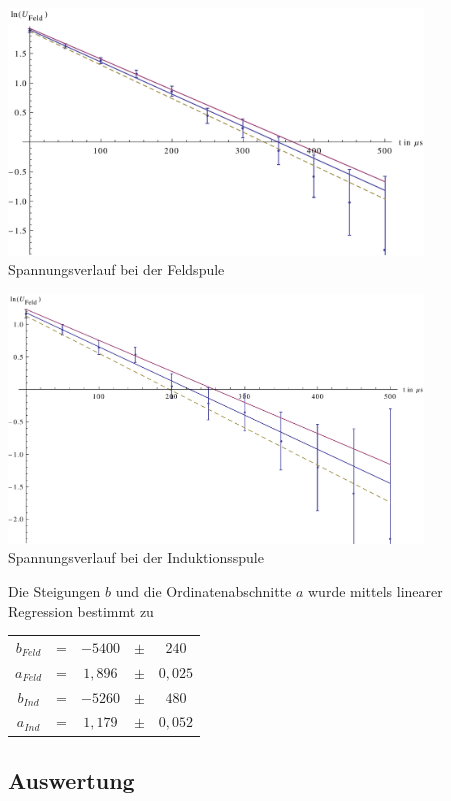 \documentclass{article}
\begin{document}
\newpage
\begin{center}

  \includegraphics[width=11cm]{graph1}
	Spannungsverlauf bei der Feldspule

	\centering
  \includegraphics[width=11cm]{graph2}
	Spannungsverlauf bei der Induktionsspule
\end{center}

\noindent
Die Steigungen \(b\) und die Ordinatenabschnitte \(a\) wurde mittels linearer Regression bestimmt zu

\begin{center}
\begin{tabular}{c c c c c} 
  \(b_{Feld}\) & = & \(-5400\) & \(\pm \) & \(240 \) \\ 
  \(a_{Feld}\) & = & \(1,896\) & \(\pm \) & \(0,025 \) \\ 
  \(b_{Ind}\) & = & \(-5260\) & \(\pm \) & \(480 \) \\ 
  \(a_{Ind}\) & = & \(1,179\) & \(\pm \) & \(0,052 \) \\ 

 \end{tabular}
\end{center}

\subsection{Auswertung}
\end{document}
